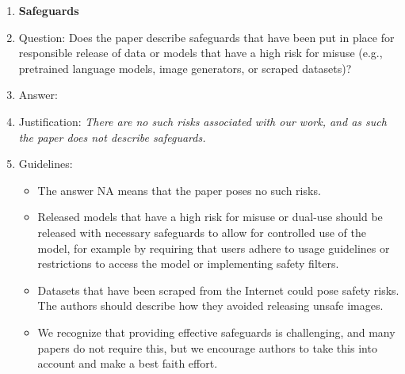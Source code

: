 \documentclass{article}
\theoremstyle{plain}
\begin{document}
\begin{enumerate}
\item {\bf Safeguards}
    \item[] Question: Does the paper describe safeguards that have been put in place for responsible release of data or models that have a high risk for misuse (e.g., pretrained language models, image generators, or scraped datasets)?
    \item[] Answer: \answerNA %
    \item[] Justification: \textit{There are no such risks associated with our work, and as such the paper does not describe safeguards.}
    \item[] Guidelines:
    \begin{itemize}
        \item The answer NA means that the paper poses no such risks.
        \item Released models that have a high risk for misuse or dual-use should be released with necessary safeguards to allow for controlled use of the model, for example by requiring that users adhere to usage guidelines or restrictions to access the model or implementing safety filters. 
        \item Datasets that have been scraped from the Internet could pose safety risks. The authors should describe how they avoided releasing unsafe images.
        \item We recognize that providing effective safeguards is challenging, and many papers do not require this, but we encourage authors to take this into account and make a best faith effort.
    \end{itemize}


\end{enumerate}
\end{document}
